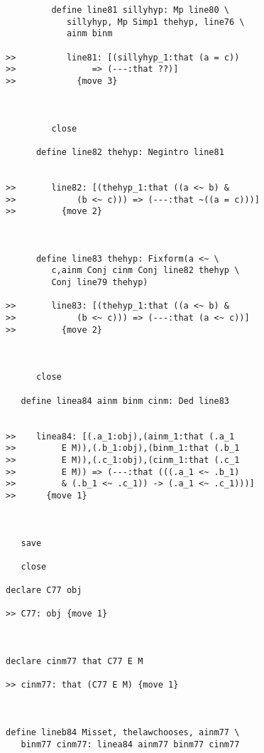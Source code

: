 \documentclass[12pt]{article}
\begin{document}
\begin{verbatim}
         define line81 sillyhyp: Mp line80 \
            sillyhyp, Mp Simp1 thehyp, line76 \
            ainm binm

>>          line81: [(sillyhyp_1:that (a = c))
>>               => (---:that ??)]
>>            {move 3}



         close

      define line82 thehyp: Negintro line81


>>       line82: [(thehyp_1:that ((a <~ b) &
>>            (b <~ c))) => (---:that ~((a = c)))]
>>         {move 2}



      define line83 thehyp: Fixform(a <~ \
         c,ainm Conj cinm Conj line82 thehyp \
         Conj line79 thehyp)

>>       line83: [(thehyp_1:that ((a <~ b) &
>>            (b <~ c))) => (---:that (a <~ c))]
>>         {move 2}



      close

   define linea84 ainm binm cinm: Ded line83


>>    linea84: [(.a_1:obj),(ainm_1:that (.a_1
>>         E M)),(.b_1:obj),(binm_1:that (.b_1
>>         E M)),(.c_1:obj),(cinm_1:that (.c_1
>>         E M)) => (---:that (((.a_1 <~ .b_1)
>>         & (.b_1 <~ .c_1)) -> (.a_1 <~ .c_1)))]
>>      {move 1}



   save

   close

declare C77 obj

>> C77: obj {move 1}



declare cinm77 that C77 E M

>> cinm77: that (C77 E M) {move 1}



define lineb84 Misset, thelawchooses, ainm77 \
   binm77 cinm77: linea84 ainm77 binm77 cinm77



\end{verbatim}
\end{document}
